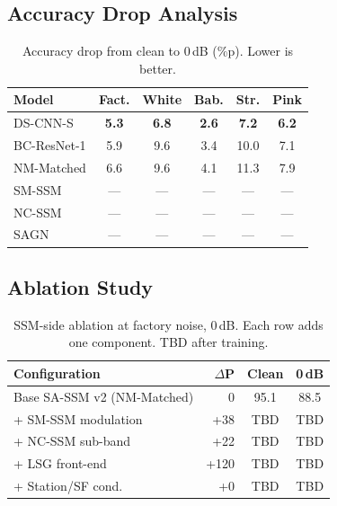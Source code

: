 \documentclass[journal]{IEEEtran}
\begin{document}
\subsection{Accuracy Drop Analysis}

\begin{table}[t]
\centering
\caption{Accuracy drop from clean to 0\,dB (\%p). Lower is better.}
\label{tab:drop}
\small
\begin{tabular}{lccccc}
\toprule
\textbf{Model} & \textbf{Fact.} & \textbf{White} & \textbf{Bab.} & \textbf{Str.} & \textbf{Pink} \\
\midrule
DS-CNN-S    & \textbf{5.3} & \textbf{6.8} & \textbf{2.6} & \textbf{7.2} & \textbf{6.2} \\
BC-ResNet-1 & 5.9 & 9.6 & 3.4 & 10.0 & 7.1 \\
NM-Matched  & 6.6 & 9.6 & 4.1 & 11.3 & 7.9 \\
SM-SSM      & --- & --- & --- & --- & --- \\
NC-SSM      & --- & --- & --- & --- & --- \\
SAGN        & --- & --- & --- & --- & --- \\
\bottomrule
\end{tabular}
\end{table}


\subsection{Ablation Study}
\label{sec:ablation}

\begin{table}[t]
\centering
\caption{SSM-side ablation at factory noise, 0\,dB. Each row adds one component. TBD after training.}
\label{tab:ablation}
\small
\begin{tabular}{lrcc}
\toprule
\textbf{Configuration} & \textbf{$\Delta$P} & \textbf{Clean} & \textbf{0\,dB} \\
\midrule
Base SA-SSM v2 (NM-Matched)  & 0     & 95.1 & 88.5 \\
\quad + SM-SSM modulation     & +38   & TBD  & TBD  \\
\quad + NC-SSM sub-band       & +22   & TBD  & TBD  \\
\quad + LSG front-end         & +120  & TBD  & TBD  \\
\quad + Station/SF cond.      & +0    & TBD  & TBD  \\
\bottomrule
\end{tabular}
\end{table}
\end{document}
